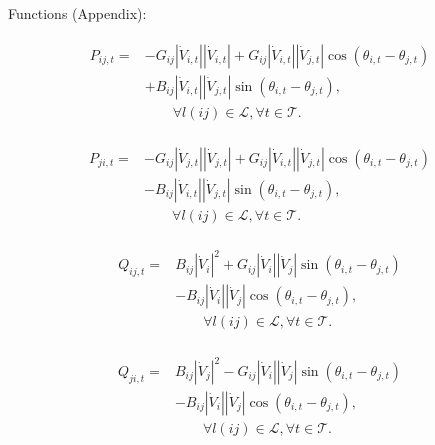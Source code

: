 \documentclass{article}
\begin{document}
Functions (Appendix):
{\allowdisplaybreaks
\begin{align}
  \begin{split}
  P_{ij,t} = &-G_{ij} \left|\dot{V}_{i,t} \right| \left|\dot{V}_{i,t} \right| 
  + G_{ij} \left|\dot{V}_{i,t} \right| \left|\dot{V}_{j,t} \right| \cos\left(\theta_{i,t}-\theta_{j,t} \right) \\
  &+ B_{ij} \left|\dot{V}_{i,t} \right| \left|\dot{V}_{j,t} \right| \sin\left(\theta_{i,t}-\theta_{j,t} \right), 
  \\ & \quad \quad\forall l(ij) \in \mathcal{L}, \forall t \in \mathcal{T}.
  \end{split}
\end{align}


\begin{align}
  \begin{split}
  P_{ji,t}=&-G_{ij} \left|\dot{V}_{j,t} \right| \left|\dot{V}_{j,t} \right| 
  + G_{ij} \left|\dot{V}_{i,t} \right| \left|\dot{V}_{j,t} \right| \cos\left(\theta_{i,t}-\theta_{j,t} \right)\\
  &- B_{ij} \left|\dot{V}_{i,t} \right| \left|\dot{V}_{j,t} \right| \sin\left(\theta_{i,t}-\theta_{j,t} \right),
  \\ & \quad \quad\forall l(ij) \in \mathcal{L}, \forall t \in \mathcal{T}.
  \end{split}
\end{align}

\begin{align}
  \begin{split}
    Q_{ij,t}=&B_{ij}\left\lvert \dot{V}_{i}\right\rvert^{2} + G_{ij}\left\lvert \dot{V}_{i}\right\rvert\left\lvert \dot{V}_{j}\right\rvert \sin{\left(\theta_{i,t}-\theta_{j,t}\right)} \\
    &- B_{ij}\left\lvert \dot{V}_{i}\right\rvert\left\lvert \dot{V}_{j}\right\rvert \cos{\left(\theta_{i,t}-\theta_{j,t}\right)},  
    \\ & \quad \quad\forall l(ij) \in \mathcal{L}, \forall t \in \mathcal{T}.
  \end{split}
\end{align}

\begin{align}
  \begin{split}
    Q_{ji,t}=&B_{ij}\left\lvert \dot{V}_{j}\right\rvert^{2} - G_{ij}\left\lvert \dot{V}_{i}\right\rvert\left\lvert \dot{V}_{j}\right\rvert \sin{\left(\theta_{i,t}-\theta_{j,t}\right)} \\
    &- B_{ij}\left\lvert \dot{V}_{i}\right\rvert\left\lvert \dot{V}_{j}\right\rvert \cos{\left(\theta_{i,t}-\theta_{j,t}\right)},  
    \\ & \quad \quad  \forall l(ij) \in \mathcal{L}, \forall t \in \mathcal{T}.
  \end{split}
\end{align}

}
\end{document}
